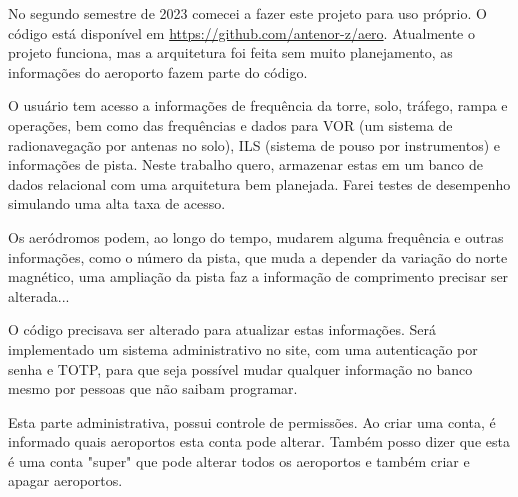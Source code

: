 No segundo semestre de 2023 comecei a fazer este projeto para uso próprio.
O código está disponível em \url{https://github.com/antenor-z/aero}. Atualmente o
projeto funciona, mas a arquitetura foi feita sem muito planejamento, as
informações do aeroporto fazem parte do código.

O usuário tem acesso a informações de frequência da torre, solo, tráfego, rampa
e operações, bem como das frequências e dados para VOR (um sistema de radionavegação
por antenas no solo), ILS (sistema de pouso por instrumentos) e informações de 
pista. Neste trabalho quero, armazenar estas em um banco de dados relacional com 
uma arquitetura bem planejada. Farei testes de desempenho simulando uma alta taxa 
de acesso.

Os aeródromos podem, ao longo do tempo, mudarem alguma frequência e outras
informações, como o número da pista, que muda a depender da variação do norte 
magnético, uma ampliação da pista faz a informação de comprimento precisar ser 
alterada...

O código precisava ser alterado para atualizar estas informações. Será implementado
 um sistema administrativo no site, com uma autenticação por senha e TOTP, para 
 que seja possível mudar qualquer informação no banco mesmo por pessoas que não 
 saibam programar.

Esta parte administrativa, possui controle de permissões. Ao criar uma conta, é
 informado quais aeroportos esta conta pode alterar. Também posso dizer que esta é
  uma conta "super" que pode alterar todos os aeroportos e também criar e apagar 
 aeroportos.
